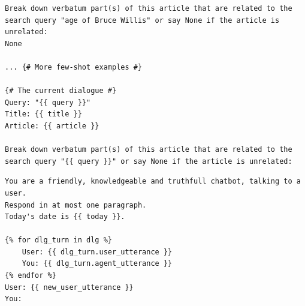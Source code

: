 \documentclass[11pt]{article}
\newcommand{\system}[0]{WikiChat\xspace}
\begin{document}
\begin{table}
\begin{lstlisting}[basicstyle=\ttfamily\small]
Break down verbatum part(s) of this article that are related to the search query "age of Bruce Willis" or say None if the article is unrelated:
None

... {# More few-shot examples #}

{# The current dialogue #}
Query: "{{ query }}"
Title: {{ title }}
Article: {{ article }}

Break down verbatum part(s) of this article that are related to the search query "{{ query }}" or say None if the article is unrelated:
\end{lstlisting}
\caption{Summarize and filter prompt of \system (Stage 2). This prompt has 7 few-shot examples.}
\label{prompt:summarization}
\end{table}

\begin{table}
\begin{lstlisting}[basicstyle=\ttfamily\small]
You are a friendly, knowledgeable and truthfull chatbot, talking to a user.
Respond in at most one paragraph.
Today's date is {{ today }}.

{% for dlg_turn in dlg %}
    User: {{ dlg_turn.user_utterance }}
    You: {{ dlg_turn.agent_utterance }}
{% endfor %}
User: {{ new_user_utterance }}
You:
\end{lstlisting}
\caption{The prompt for baseline chatbots, also used for Stage 3 of \system. This prompt is zero-shot.}
\label{prompt:baseline}
\end{table}
\end{document}
